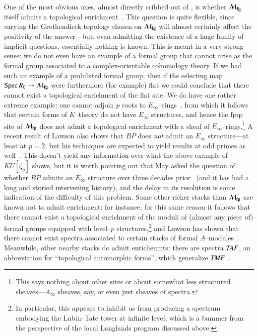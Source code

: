 One of the most obvious ones, almost directly cribbed out of , is whether $\mathcal{M}_{\mathbf{fg}}$ itself admits a topological enrichment~\cite{GoerssRealizingFamilies}.  This question is quite flexible, since varying the Grothendieck topology chosen on $\mathcal{M}_{\mathbf{fg}}$ will almost certainly affect the positivity of the answer---but, even admitting the existence of a huge family of implicit questions, essentially nothing is known.  This is meant in a very strong sense: we do not even have an example of a formal group that cannot arise as the formal group associated to a complex-orientable cohomology theory.  If we had such an example of a prohibited formal group, then if the selecting map $\operatorname{Spec} R_0 \to \mathcal{M}_{\mathbf{fg}}$ were furthermore (for example) flat we could conclude that there cannot exist a topological enrichment of the flat site.  We do have one rather extreme example: one cannot adjoin $p${\th} roots to $E_\infty$--rings~\cite{SchwaenzlRolandVogt,Devalapurkar}, from which it follows that certain forms of $K$--theory do not have $E_\infty$ structures, and hence the fpqc site of $\mathcal{M}_{\mathbf{fg}}$ does not admit a topological enrichment with a sheaf of $E_\infty$--rings.\footnote{This says nothing about other sites or about somewhat less structured sheaves---$A_\infty$ sheaves, say, or even just sheaves of spectra.}  A recent result of Lawson also shows that $BP$ does \emph{not} admit an $E_\infty$ structure---at least at $p = 2$, but his techniques are expected to yield results at odd primes as well~\cite{LawsonSecondaryPowerOps}.  This doesn't yield any information over what the above example of $KU[\zeta_p]$ shows, but it is worth pointing out that May asked the question of whether $BP$ admits an $E_\infty$ structure over three decades prior~\cite{MayProblemsInLoopspaceTheory} (and it has had a long and storied intervening history), and the delay in its resolution is some indication of the difficulty of this problem.  Some other richer stacks than $\mathcal{M}_{\mathbf{fg}}$ are known not to admit enrichment: for instance, for this same reason it follows that there cannot exist a topological enrichment of the moduli of (almost any piece of) formal groups equipped with level--$p$ structures,\footnote{In particular, this appears to inhibit us from producing a spectrum embodying the Lubin--Tate tower at infinite level, which is a bummer from the perspective of the local Langlands program discussed above.} and Lawson has shown that there cannot exist spectra associated to certain stacks of formal $A$--modules~\cite{LawsonRealizability}.  Meanwhile, other nearby stacks do admit enrichemnts: there are spectra $\mathit{TAF}$, an abbreviation for ``topological automorphic forms'', which generalize $\mathit{TMF}$~\cite{BehrensLawson}.

